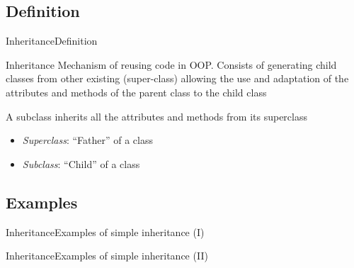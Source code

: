 \documentclass[10pt,compress]{beamer} %
\begin{document}
\subsection{Definition}

\begin{frame}{Inheritance}{Definition}
\vspace{-0.2cm}
	\begin{block}{Inheritance}
	Mechanism of \alert{reusing} code in OOP. Consists of generating child classes from other existing (\alert{super-class}) allowing the use and adaptation of the attributes and methods of the parent class to the child class
  	\end{block}	

    \bigskip

		A subclass inherits all the attributes and methods from its superclass
        \begin{itemize}
		\item {\textit{Superclass}: ``Father'' of a class}
		\item {\textit{Subclass}: ``Child'' of a class}
        \end{itemize}
\end{frame}

\subsection{Examples}
\begin{frame}{Inheritance}{Examples of simple inheritance (I)}
\end{frame}

\begin{frame}{Inheritance}{Examples of simple inheritance (II)}
\end{frame}
\end{document}
